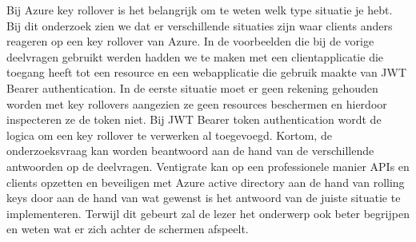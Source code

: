 Bij Azure key rollover is het belangrijk om te weten welk type situatie je hebt. Bij dit onderzoek zien we dat er verschillende situaties zijn waar clients anders reageren op een key rollover van Azure. In de voorbeelden die bij de vorige deelvragen gebruikt werden hadden we te maken met een clientapplicatie die toegang heeft tot een resource en een webapplicatie die gebruik maakte van JWT Bearer authentication. In de eerste situatie moet er geen rekening gehouden worden met key rollovers aangezien ze geen resources beschermen en hierdoor inspecteren ze de token niet. Bij JWT Bearer token authentication wordt de logica om een key rollover te verwerken al toegevoegd.\newline\newline
Kortom, de onderzoeksvraag kan worden beantwoord aan de hand van de verschillende antwoorden op de deelvragen. Ventigrate kan op een professionele manier APIs en clients opzetten en beveiligen met Azure active directory aan de hand van rolling keys door aan de hand van wat gewenst is het antwoord van de juiste situatie te implementeren. Terwijl dit gebeurt zal de lezer het onderwerp ook beter begrijpen en weten wat er zich achter de schermen afspeelt.

